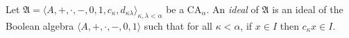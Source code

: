 Let $\mathfrak{A} = \langle A, +, \cdot, -, 0, 1, c_{\kappa}, d_{\kappa\lambda} \rangle_{\kappa,\lambda < \alpha}$ be a $\mathrm{CA}_{\alpha}$. An \textit{ideal} of $\mathfrak{A}$ is an ideal of the Boolean algebra $\langle A, +, \cdot, -, 0, 1 \rangle$ such that for all $\kappa < \alpha$, if $x \in I$ then $c_{\kappa} x \in I$.
